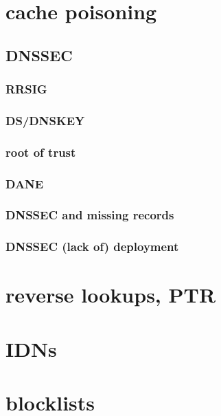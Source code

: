 

\section{cache poisoning}




\subsection{DNSSEC}


\subsubsection{RRSIG}


\subsubsection{DS/DNSKEY}


\subsubsection{root of trust}


\subsubsection{DANE}


\subsubsection{DNSSEC and missing records}


\subsubsection{DNSSEC (lack of) deployment}


\section{reverse lookups, PTR}


\section{IDNs}


\section{blocklists}


